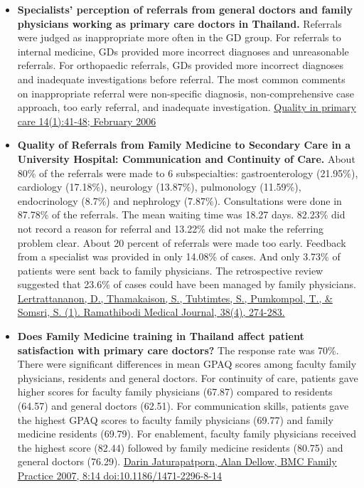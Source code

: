 \documentclass[]{book}
\begin{document}
\begin{itemize}
\item
  \textbf{Specialists' perception of referrals from general doctors and family physicians working as primary care doctors in Thailand.} Referrals were judged as inappropriate more often in the GD group. For referrals to internal medicine, GDs provided more incorrect diagnoses and unreasonable referrals. For orthopaedic referrals, GDs provided more incorrect diagnoses and inadequate investigations before referral. The most common comments on inappropriate referral were non-specific diagnosis, non-comprehensive case approach, too early referral, and inadequate investigation. \href{https://www.researchgate.net/publication/233627532_Specialists'_perception_of_referrals_from_general_doctors_and_family_physicians_working_as_primary_care_doctors_in_Thailand}{Quality in primary care 14(1):41-48; February 2006}
\item
  \textbf{Quality of Referrals from Family Medicine to Secondary Care in a University Hospital: Communication and Continuity of Care.} About 80\% of the referrals were made to 6 subspecialties: gastroenterology (21.95\%), cardiology (17.18\%), neurology (13.87\%), pulmonology (11.59\%), endocrinology (8.7\%) and nephrology (7.87\%). Consultations were done in 87.78\% of the referrals. The mean waiting time was 18.27 days. 82.23\% did not record a reason for referral and 13.22\% did not make the referring problem clear. About 20 percent of referrals were made too early. Feedback from a specialist was provided in only 14.08\% of cases. And only 3.73\% of patients were sent back to family physicians. The retrospective review suggested that 23.6\% of cases could have been managed by family physicians. \href{https://www.tci-thaijo.org/index.php/ramajournal/article/view/57463}{Lertrattananon, D., Thamakaison, S., Tubtimtes, S., Pumkompol, T., \& Somsri, S. (1). Ramathibodi Medical Journal, 38(4), 274-283.}
\item
  \textbf{Does Family Medicine training in Thailand affect patient satisfaction with primary care doctors?} The response rate was 70\%. There were significant differences in mean GPAQ scores among faculty family physicians, residents and general doctors. For continuity of care, patients gave higher scores for faculty family physicians (67.87) compared to residents (64.57) and general doctors (62.51). For communication skills, patients gave the highest GPAQ scores to faculty family physicians (69.77) and family medicine residents (69.79). For enablement, faculty family physicians received the highest score (82.44)
  followed by family medicine residents (80.75) and general doctors (76.29). \href{https://www.ncbi.nlm.nih.gov/pmc/articles/PMC1852109/pdf/1471-2296-8-14.pdf}{Darin Jaturapatporn, Alan Dellow, BMC Family Practice 2007, 8:14 doi:10.1186/1471-2296-8-14}
\end{itemize}
\end{document}
